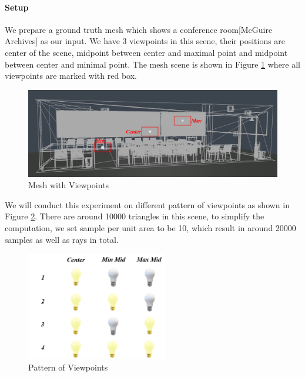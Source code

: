 \documentclass[11pt, a4paper,oneside,chapterprefix=false]{scrbook}
\begin{document}
\paragraph{Setup}

We prepare a ground truth mesh which shows a conference room[McGuire Archives] as our input. We have 3 viewpoints in this scene, their positions are center of the scene, midpoint between center and maximal point and midpoint between center and minimal point. The mesh scene is shown in Figure \ref{fig:mesh with viewpoints} where all viewpoints are marked with red box. 

\vspace{20pt}

\begin{figure}[H]
    \centering
    \includegraphics*[width=1.0\textwidth]{figures/mesh with vps.png}
    \caption{Mesh with Viewpoints}
    \label{fig:mesh with viewpoints}
\end{figure}

\vspace{10pt}

We will conduct this experiment on different pattern of viewpoints as shown in Figure \ref{fig:pattern of viewpoints}. 
There are around 10000 triangles in this scene, to simplify the computation, we set sample per unit area to be 10, which result in around 20000 samples as well as rays in total. 

\begin{figure}[H]
    \centering
    \includegraphics*[width=0.55\textwidth]{figures/pattern of viewpoints.png}
    \caption{Pattern of Viewpoints}
    \label{fig:pattern of viewpoints}
\end{figure}
\end{document}
